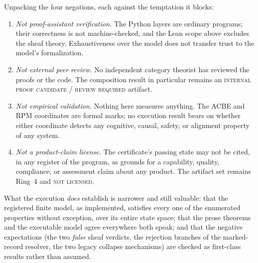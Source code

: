 \begin{boundary}
\label{ch11:bnd:governing}
Unpacking the four negations, each against the temptation it blocks:
\begin{enumerate}
\item \emph{Not proof-assistant verification.} The Python layers are
ordinary programs; their correctness is not machine-checked, and the Lean
scope above excludes the sheaf theory. Exhaustiveness over the model does
not transfer trust to the model's formalization.
\item \emph{Not external peer review.} No independent category theorist has
reviewed the proofs or the code. The composition result in particular
remains an \textsc{internal proof candidate / review required} artifact.
\item \emph{Not empirical validation.} Nothing here measures anything. The
ACBE and RPM coordinates are formal marks; no execution result bears on
whether either coordinate detects any cognitive, causal, safety, or
alignment property of any system.
\item \emph{Not a product-claim license.} The certificate's passing state
may not be cited, in any register of the program, as grounds for a
capability, quality, compliance, or assessment claim about any product. The
artifact set remains Ring~4 and \textsc{not licensed}.
\end{enumerate}
What the execution \emph{does} establish is narrower and still valuable:
that the registered finite model, as implemented, satisfies every one of the
enumerated properties without exception, over its entire state space; that
the prose theorems and the executable model agree everywhere both speak;
and that the negative expectations (the two \emph{false} sheaf verdicts,
the rejection branches of the marked-record resolver, the two legacy
collapse mechanisms) are checked as first-class results rather than assumed.
\end{boundary}

